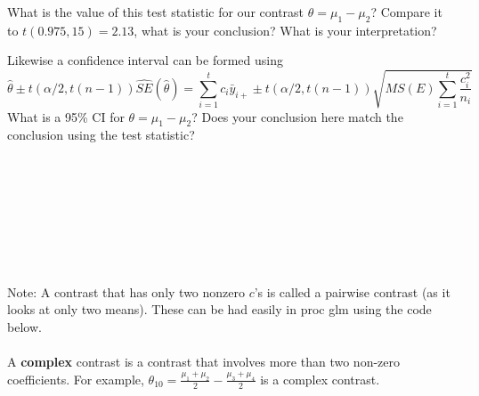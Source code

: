 What is the value of this test statistic for our contrast $\theta=\mu_1-\mu_2$?  Compare it to $t(0.975,15)=2.13$, what is your conclusion?  What is your interpretation?

\newpage

Likewise a confidence interval can be formed using
$$\hat{\theta}\pm t(\alpha/2,t(n-1))\hat{SE}(\hat{\theta}) = \sum_{i=1}^{t}c_{i}\bar{y}_{i+}\pm t(\alpha/2,t(n-1))\sqrt{MS(E)\sum_{i=1}^{t}\frac{c_{i}^2}{n_{i}}}$$
What is a 95\% CI for $\theta=\mu_1-\mu_2$?  Does your conclusion here match the conclusion using the test statistic?\\~\\~\\~\\~\\~\\~\\~\\~\\

Note:  A contrast that has only two nonzero $c$'s is called a pairwise contrast (as it looks at only two means).  These can be had easily in proc glm using the code below.
\\~\\

A \textbf{complex} contrast is a contrast that involves more than two non-zero coefficients.  For example, $\theta_{10}=\frac{\mu_{1}+\mu_{2}}{2}-\frac{\mu_{3}+\mu_{4}}{2}$ is a complex contrast.  \\~\\

